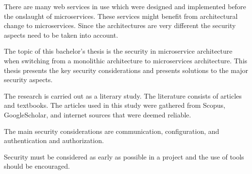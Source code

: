 \begin{enabstract}
    \begin{sloppypar}
        There are many web services in use which were designed and implemented 
        before the onslaught of microservices. These services might benefit 
        from architectural change to microservices. Since the architectures
        are very different the security aspects need to be taken into account.
    \end{sloppypar}
    \begin{sloppypar}    
        The topic of this bachelor's thesis is the security in microservice 
        architecture when switching from a monolithic architecture to 
        microservices architecture. This thesis presents the key security 
        considerations and presents solutions to the major security aspects.
    \end{sloppypar}
    \begin{sloppypar}
        The research is carried out as a literary study.
        The literature consists of articles and textbooks.
        The articles used in this study were gathered from Scopus, 
        GoogleScholar, and internet sources that were deemed reliable.
    \end{sloppypar}
    \begin{sloppypar}
        The main security considerations are communication, configuration, 
        and authentication and authorization. 
    \end{sloppypar}
    \begin{sloppypar}
        Security must be considered as early as possible in a project 
        and the use of tools should be encouraged.
    \end{sloppypar}
\end{enabstract}
